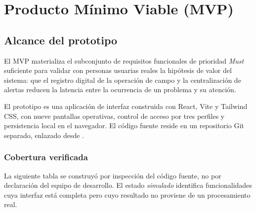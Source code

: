 
\newpage
\section{Producto Mínimo Viable (MVP)}

\subsection{Alcance del prototipo}

El MVP materializa el subconjunto de requisitos funcionales de prioridad \emph{Must} suficiente para
validar con personas usuarias reales la hipótesis de valor del sistema: que el registro digital de
la operación de campo y la centralización de alertas reducen la latencia entre la ocurrencia de un
problema y su atención.

El prototipo es una aplicación de interfaz construida con React, Vite y Tailwind CSS, con nueve
pantallas operativas, control de acceso por tres perfiles y persistencia local en el navegador. El
código fuente reside en un repositorio Git separado, enlazado desde .

\subsubsection{Cobertura verificada}

La siguiente tabla se construyó por inspección del código fuente, no por declaración del equipo de
desarrollo. El estado \emph{simulado} identifica funcionalidades cuya interfaz está completa pero
cuyo resultado no proviene de un procesamiento real.

